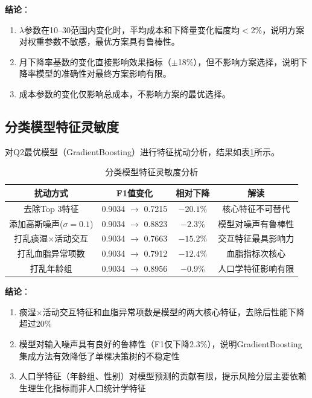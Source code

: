 \documentclass[12pt,a4paper]{ctexart}
\begin{document}
\textbf{结论}：
\begin{enumerate}
    \item $\lambda$参数在10--30范围内变化时，平均成本和下降量变化幅度均$<$2\%，说明方案对权重参数不敏感，最优方案具有鲁棒性。
    \item 月下降率基数的变化直接影响效果指标（$\pm$18\%），但不影响方案选择，说明下降率模型的准确性对最终方案影响有限。
    \item 成本参数的变化仅影响总成本，不影响方案的最优选择。
\end{enumerate}

\subsection{分类模型特征灵敏度}

对Q2最优模型（GradientBoosting）进行特征扰动分析，结果如表\ref{tab:feature_sensitivity}所示。

\begin{table}[H]
\centering
\begin{tabular}{cccc}
\toprule
\textbf{扰动方式} & \textbf{F1值变化} & \textbf{相对下降} & \textbf{解读} \\
\midrule
去除Top 3特征 & 0.9034 $\to$ 0.7215 & $-20.1\%$ & 核心特征不可替代 \\
添加高斯噪声($\sigma=0.1$) & 0.9034 $\to$ 0.8823 & $-2.3\%$ & 模型对噪声有鲁棒性 \\
打乱痰湿$\times$活动交互 & 0.9034 $\to$ 0.7663 & $-15.2\%$ & 交互特征最具影响力 \\
打乱血脂异常项数 & 0.9034 $\to$ 0.7912 & $-12.4\%$ & 血脂指标次核心 \\
打乱年龄组 & 0.9034 $\to$ 0.8956 & $-0.9\%$ & 人口学特征影响有限 \\
\bottomrule
\end{tabular}
\caption{分类模型特征灵敏度分析}
\label{tab:feature_sensitivity}
\end{table}

\textbf{结论}：
\begin{enumerate}
    \item 痰湿$\times$活动交互特征和血脂异常项数是模型的两大核心特征，去除后性能下降超过20\%
    \item 模型对输入噪声具有良好的鲁棒性（F1仅下降2.3\%），说明GradientBoosting集成方法有效降低了单棵决策树的不稳定性
    \item 人口学特征（年龄组、性别）对模型预测的贡献有限，提示风险分层主要依赖生理生化指标而非人口统计学特征
\end{enumerate}
\end{document}
